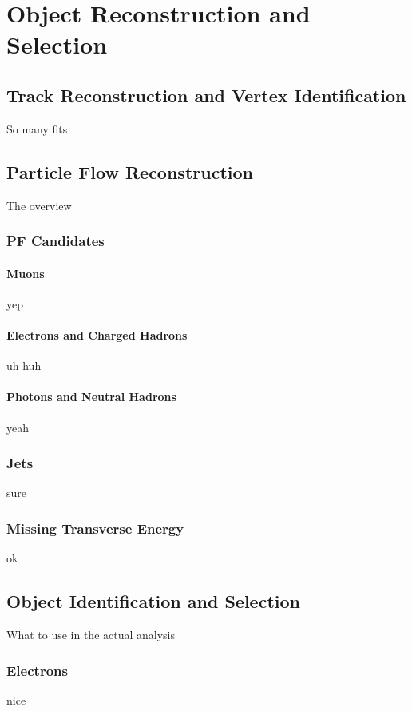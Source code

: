 \chapter{Object Reconstruction and Selection}

\section{Track Reconstruction and Vertex Identification}
So many fits



\section{Particle Flow Reconstruction}
The overview

\subsection{PF Candidates}

\subsubsection{Muons}
yep

\subsubsection{Electrons and Charged Hadrons}
uh huh

\subsubsection{Photons and Neutral Hadrons}
yeah


\subsection{Jets}
sure


\subsection{Missing Transverse Energy}
ok



\section{Object Identification and Selection}
What to use in the actual analysis

\subsection{Electrons}
nice


